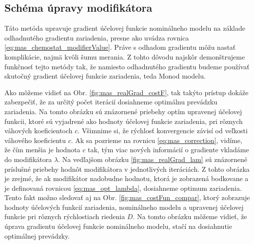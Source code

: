 \subsection{Schéma úpravy modifikátora}
Táto metóda upravuje gradient účelovej funkcie nominálneho modelu na základe odhadnutého gradientu zariadenia, presne ako uvádza rovnica \eqref{eq:mas_chemostat_modifierValue}. Práve s odhadom gradientu môžu nastať komplikácie, najmä kvôli šumu merania. Z tohto dôvodu najskôr demonštrujeme funkčnosť tejto metódy tak, že namiesto odhadnutého gradientu budeme používať skutočný gradient účelovej funkcie zariadenia, teda Monod modelu. 

Ako môžeme vidieť na Obr. \ref{fig:mas_realGrad_costF}, tak takýto prístup dokáže zabezpečiť, že za určitý počet iterácií dosiahneme optimálnu prevádzku zariadenia. Na tomto obrázku sú znázornené priebehy optím upravenej účelovej funkcii, ktoré sú vyjadrené ako hodnoty účelovej funkcie zariadenia, pri rôznych váhových koeficientoch $ c $. Všimnime si, že rýchlosť konvergencie závisí od veľkosti váhového koeficientu $ c $. Ak sa pozrieme na rovnicu \eqref{eq:mas_correction}, vidíme, že čím menšia je hodnota $ c $ tak, tým viac nových informácií o gradiente vkladáme do modifikátora $ \lambda $. Na vedľajšom obrázku \ref{fig:mas_realGrad_lam} sú znázornené príslušné priebehy hodnôt modifikátora v jednotlivých iteráciách. Z tohto obrázka je zrejmé, že ak modifikátor nadobudne hodnotu, ktorá je zobrazená bodkovane a je definovaná rovnicou \eqref{eq:mas_opt_lambda}, dosiahneme optimum zariadenia. Tento fakt možno sledovať aj na Obr. \ref{fig:mas_costFun_compar}, ktorý zobrazuje hodnoty účelových funkcií zariadenia, nominálneho modelu a upravenej účelovej funkcie pri rôznych rýchlostiach riedenia $ D $. Na tomto obrázku môžeme vidieť, že úprava gradientu účelovej funkcie nominálneho modelu, stačí na dosiahnutie optimálnej prevádzky.


